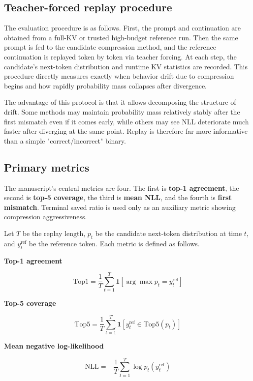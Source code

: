 \subsection{Teacher-forced replay procedure}


The evaluation procedure is as follows. First, the prompt and continuation are obtained from a full-KV or trusted high-budget reference run. Then the same prompt is fed to the candidate compression method, and the reference continuation is replayed token by token via teacher forcing. At each step, the candidate's next-token distribution and runtime KV statistics are recorded. This procedure directly measures exactly when behavior drift due to compression begins and how rapidly probability mass collapses after divergence.


The advantage of this protocol is that it allows decomposing the structure of drift. Some methods may maintain probability mass relatively stably after the first mismatch even if it comes early, while others may see NLL deteriorate much faster after diverging at the same point. Replay is therefore far more informative than a simple "correct/incorrect" binary.


\subsection{Primary metrics}


The manuscript's central metrics are four. The first is \textbf{top-1 agreement}, the second is \textbf{top-5 coverage}, the third is \textbf{mean NLL}, and the fourth is \textbf{first mismatch}. Terminal saved ratio is used only as an auxiliary metric showing compression aggressiveness.


Let $T$ be the replay length, $p_t$ be the candidate next-token distribution at time $t$, and $y_t^{\mathrm{ref}}$ be the reference token. Each metric is defined as follows.


\textbf{Top-1 agreement}


$$
\mathrm{Top1}
=
\frac{1}{T}
\sum_{t=1}^{T}
\mathbf{1}\left[\arg\max p_t = y_t^{\mathrm{ref}}\right]
$$


\textbf{Top-5 coverage}


$$
\mathrm{Top5}
=
\frac{1}{T}
\sum_{t=1}^{T}
\mathbf{1}\left[y_t^{\mathrm{ref}} \in \mathrm{Top5}(p_t)\right]
$$


\textbf{Mean negative log-likelihood}


$$
\mathrm{NLL}
=
-
\frac{1}{T}
\sum_{t=1}^{T}
\log p_t\left(y_t^{\mathrm{ref}}\right)
$$


